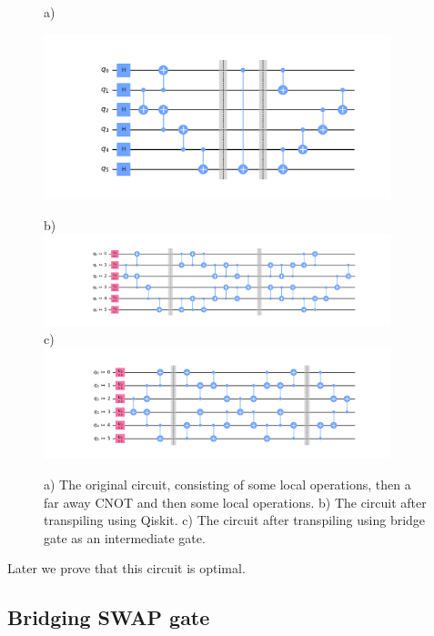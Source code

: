 \documentclass{article}
\begin{document}
  \begin{figure}[h]
    a) \\
    \begin{center}
    \includegraphics[width=0.9\textwidth]{../../code/expm_1_bridge/out/original_circuit}
    \end{center}
    b) \\
    \includegraphics[width=0.9\textwidth]{../../code/expm_1_bridge/out/transpiled_circuit_swap} \\
    c) \\
    \includegraphics[width=0.9\textwidth]{../../code/expm_1_bridge/out/transpiled_circuit_bridge}
    \caption{a) The original circuit, consisting of some local operations, then a far away CNOT and then some local operations. b) The circuit after transpiling using Qiskit. c) The circuit after transpiling using bridge gate as an intermediate gate.}
  \end{figure}

    Later we prove that this circuit is optimal.

\subsection*{Bridging SWAP gate}
\end{document}
